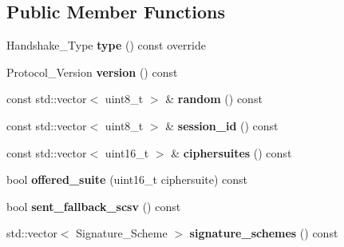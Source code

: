\subsection*{Public Member Functions}
\begin{DoxyCompactItemize}
\item 
\mbox{\label{class_botan_1_1_t_l_s_1_1_client___hello_ad4a149baa547ebdda7eb7bd0337df1bb}} 
Handshake\+\_\+\+Type {\bfseries type} () const override
\item 
\mbox{\label{class_botan_1_1_t_l_s_1_1_client___hello_a39cc16019ece063688370495d3172260}} 
Protocol\+\_\+\+Version {\bfseries version} () const
\item 
\mbox{\label{class_botan_1_1_t_l_s_1_1_client___hello_aefd20decceddadc72574ea99ac02c45e}} 
const std\+::vector$<$ uint8\+\_\+t $>$ \& {\bfseries random} () const
\item 
\mbox{\label{class_botan_1_1_t_l_s_1_1_client___hello_ae6653c8214bb701b0074abd864f4f2bd}} 
const std\+::vector$<$ uint8\+\_\+t $>$ \& {\bfseries session\+\_\+id} () const
\item 
\mbox{\label{class_botan_1_1_t_l_s_1_1_client___hello_ab6417bb1546d803e0fcb89252ca1f5c5}} 
const std\+::vector$<$ uint16\+\_\+t $>$ \& {\bfseries ciphersuites} () const
\item 
\mbox{\label{class_botan_1_1_t_l_s_1_1_client___hello_a24f31b634e35a2e554ef28ce6ea39ee1}} 
bool {\bfseries offered\+\_\+suite} (uint16\+\_\+t ciphersuite) const
\item 
\mbox{\label{class_botan_1_1_t_l_s_1_1_client___hello_ad19741dbebef039775fdfe53db08dace}} 
bool {\bfseries sent\+\_\+fallback\+\_\+scsv} () const
\item 
\mbox{\label{class_botan_1_1_t_l_s_1_1_client___hello_a13c5cd4d41929e2b325732656960066c}} 
std\+::vector$<$ Signature\+\_\+\+Scheme $>$ {\bfseries signature\+\_\+schemes} () const

\end{DoxyCompactItemize}
